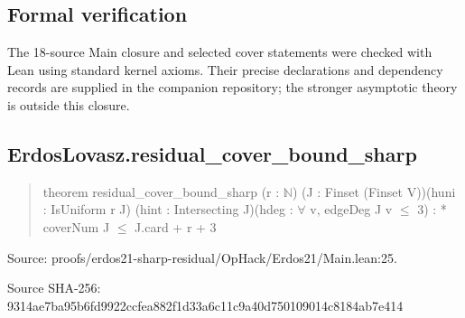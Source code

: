 \documentclass[11pt,a4paper]{article}
\begin{document}
\subsection{Formal verification}
The 18-source Main closure and selected cover statements were checked with Lean using standard kernel axioms. Their precise declarations and dependency records are supplied in the companion repository; the stronger asymptotic theory is outside this closure.

\begin{samepage}
\subsection{ErdosLovasz.residual\_cover\_bound\_sharp}
\begin{quote}\small\ttfamily theorem residual\_cover\_bound\_sharp (r : \ensuremath{\mathbb{N}}) (J : Finset (Finset V))\newline     (huni : IsUniform r J) (hint : Intersecting J)\newline     (hdeg : \ensuremath{\forall} v, edgeDeg J v \ensuremath{\leq} 3) : * coverNum J \ensuremath{\leq} J.card + r + 3\end{quote}
{\small Source: proofs/erdos21-sharp-residual/OpHack/Erdos21/Main.lean:25.\par}

{\small Source SHA-256: 9314ae7ba95b6fd9922ccfea882f1d33a6c11c9a40d750109014c8184ab7e414\par}

\end{samepage}
\end{document}
